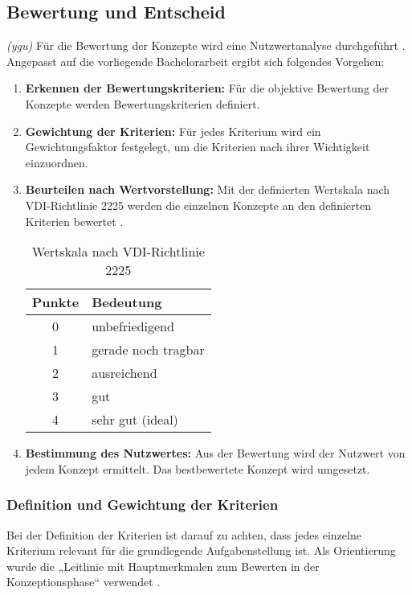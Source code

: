 \subsection{Bewertung und Entscheid}
\textit{(ygu)} Für die Bewertung der Konzepte wird eine Nutzwertanalyse durchgeführt \cite{naefe}. Angepasst auf die vorliegende Bachelorarbeit ergibt sich folgendes Vorgehen:

\begin{enumerate}
	\item \textbf{Erkennen der Bewertungskriterien:} Für die objektive Bewertung der Konzepte werden Bewertungskriterien definiert.
	
	\item \textbf{Gewichtung der Kriterien:} Für jedes Kriterium wird ein Gewichtungsfaktor festgelegt, um die Kriterien nach ihrer Wichtigkeit einzuordnen.
	
	\item \textbf{Beurteilen nach Wertvorstellung:} Mit der definierten Wertskala nach VDI-Richtlinie 2225 werden die einzelnen Konzepte an den definierten Kriterien bewertet \cite{vdi2225}.

\begin{table}[H]
	\begin{tabular}{|c|l|}
		\hline 
		\textbf{Punkte} & \textbf{Bedeutung} \\ 
		\hline 
		0 & unbefriedigend \\ 
		\hline 
		1 & gerade noch tragbar \\ 
		\hline 
		2 & ausreichend \\ 
		\hline 
		3 & gut \\ 
		\hline 
		4 & sehr gut (ideal) \\ 
		\hline 
	\end{tabular} 
	\caption{Wertskala nach VDI-Richtlinie 2225}
	\label{tab:wertskala}
\end{table}	
	
	
	\item \textbf{Bestimmung des Nutzwertes:} Aus der Bewertung wird der Nutzwert von jedem Konzept ermittelt. Das bestbewertete Konzept wird umgesetzt.
\end{enumerate}

\subsubsection{Definition und Gewichtung der Kriterien}
Bei der Definition der Kriterien ist darauf zu achten, dass jedes einzelne Kriterium relevant für die grundlegende Aufgabenstellung ist.
Als Orientierung wurde die „Leitlinie mit Hauptmerkmalen zum Bewerten in der Konzeptionsphase“ verwendet \cite{pahl}. 
\newline

